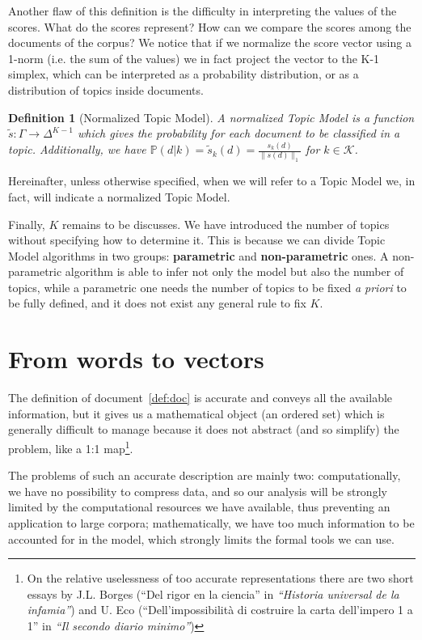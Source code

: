 \documentclass[11pt, a4paper, oneside, openright]{book}
\newtheorem{definition}{Definition}
\begin{document}
Another flaw of this definition is the difficulty in interpreting the values of the scores. What do the scores represent? How can we compare the scores among the documents of the corpus?
We notice that if we normalize the score vector using a 1-norm (i.e. the sum of the values) we in fact project the vector to the K-1 simplex, which can be interpreted as a probability distribution, or as a distribution of topics inside documents.
\begin{definition}[Normalized Topic Model]
	A normalized Topic Model is a function $\tilde{s}: \Gamma \rightarrow {\Delta}^{K-1}$ which gives the probability for each document to be classified in a topic. Additionally, we have $\mathbb{P}(d|k) = \tilde{s}_k(d) = \frac{s_k(d)}{\|s(d)\|_1}$ for $k \in \mathcal{K}$.
\end{definition}
Hereinafter, unless otherwise specified, when we will refer to a Topic Model we, in fact, will indicate a normalized Topic Model.

Finally, $K$ remains to be discusses. We have introduced the number of topics without specifying how to determine it. This is because we can divide Topic Model algorithms in two groups: \textbf{parametric} and \textbf{non-parametric} ones.
A non-parametric algorithm is able to infer not only the model but also the number of topics, while a parametric one needs the number of topics to be fixed \textit{a priori} to be fully defined, and it does not exist any general rule to fix $K$.

\chapter{From words to vectors}
The definition of document~\ref{def:doc} is accurate and conveys all the available information, but it gives us a mathematical object (an ordered set) which is generally difficult to manage because it does not abstract (and so simplify) the problem, like a 1:1 map\footnote{On the relative uselessness of too accurate representations there are two short essays by J.L. Borges (``Del rigor en la ciencia'' in \textit{``Historia universal de la infamia''}) and U. Eco (``Dell'impossibilità di costruire la carta dell'impero 1 a 1'' in \textit{``Il secondo diario minimo''})}.

The problems of such an accurate description are mainly two: computationally, we have no possibility to compress data, and so our analysis will be strongly limited by the computational resources we have available, thus preventing an application to large corpora; mathematically, we have too much information to be accounted for in the model, which strongly limits the formal tools we can use.
\end{document}
